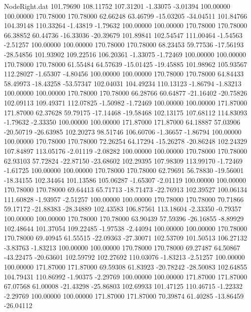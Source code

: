 \begin{filecontents}{NodeRight.dat}
 101.79690  108.11752  107.31201    -1.33075   -3.01394  100.00000  100.00000  170.78000  170.78000   62.66248   63.46799  -15.03205  -34.04511
 101.84766  104.39148  110.33264    -1.43819   -1.79632  100.00000  100.00000  170.78000  170.78000   66.38852   60.44736  -16.33036  -20.39679
 101.89841  102.54547  111.00464    -1.54563   -2.51257  100.00000  100.00000  170.78000  170.78000   68.23453   59.77536  -17.56193  -28.54856
 101.93902  109.22516  106.20361    -1.33075   -1.72469  100.00000  100.00000  170.78000  170.78000   61.55484   64.57639  -15.01425  -19.45885
 101.98962  105.93567  112.28027    -1.65307   -4.80456  100.00000  100.00000  170.78000  170.78000   64.84433   58.49973  -18.43258  -53.57347
 102.04031  104.49234  110.13123    -1.86794   -1.83213  100.00000  100.00000  170.78000  170.78000   66.28766   60.64877  -21.16402  -20.75826
 102.09113  109.49371  112.07825    -1.50982   -1.72469  100.00000  100.00000  171.87000  171.87000   62.37628   59.79175  -17.14468  -19.58468
 102.13175  107.68112  114.83093    -1.79632   -2.33350  100.00000  100.00000  171.87000  171.87000   64.18887   57.03906  -20.50719  -26.63985
 102.20273   98.51746  106.60706    -1.36657   -1.86794  100.00000  100.00000  170.78000  170.78000   72.26254   64.17294  -15.26278  -20.86248
 102.24329  107.84897  113.05176    -2.01119   -2.08282  100.00000  100.00000  170.78000  170.78000   62.93103   57.72824  -22.87150  -23.68602
 102.29395  107.98309  113.99170    -1.72469   -1.61725  100.00000  100.00000  170.78000  170.78000   62.79691   56.78830  -19.56001  -18.34155
 102.34464  101.13586  105.06287    -1.65307   -2.01119  100.00000  100.00000  170.78000  170.78000   69.64413   65.71713  -18.71473  -22.76913
 102.39527  100.06134  111.60828    -1.93957   -2.51257  100.00000  100.00000  170.78000  170.78000   70.71866   59.17172  -21.88383  -28.34889
 102.43583  106.87561  113.18604    -2.33350   -0.79357  100.00000  100.00000  170.78000  170.78000   63.90439   57.59396  -26.16855   -8.89929
 102.48644  101.37054  109.22485    -1.97538   -2.44094  100.00000  100.00000  170.78000  170.78000   69.40945   61.55515  -22.09363  -27.30071
 102.53709  101.50513  106.27132    -3.83763   -1.83213  100.00000  100.00000  170.78000  170.78000   69.27487   64.50867  -43.22475  -20.63601
 102.59792  102.27692  110.03076    -1.83213   -2.51257  100.00000  100.00000  171.87000  171.87000   69.59308   61.83923  -20.78242  -28.50083
 102.64855  104.79431  110.86992    -1.90375   -2.29769  100.00000  100.00000  171.87000  171.87000   67.07568   61.00008  -21.43298  -25.86803
 102.69933  101.47125  110.46715    -1.22332   -2.29769  100.00000  100.00000  171.87000  171.87000   70.39874   61.40285  -13.86459  -26.04112

\end{filecontents}
